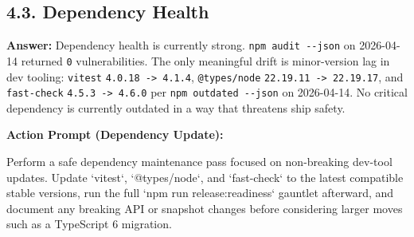 \subsection{4.3. Dependency Health}\label{record-416-dependency-health}

\textbf{Answer:} Dependency health is currently strong. \texttt{n\allowbreak{}p\allowbreak{}m\allowbreak{} \allowbreak{}a\allowbreak{}u\allowbreak{}d\allowbreak{}i\allowbreak{}t\allowbreak{} \allowbreak{}-\allowbreak{}-\allowbreak{}j\allowbreak{}s\allowbreak{}o\allowbreak{}n} on 2026-04-14 returned \texttt{0} vulnerabilities. The only meaningful drift is minor-version lag in dev tooling: \texttt{v\allowbreak{}i\allowbreak{}t\allowbreak{}e\allowbreak{}s\allowbreak{}t} \texttt{4\allowbreak{}.\allowbreak{}0\allowbreak{}.\allowbreak{}1\allowbreak{}8\allowbreak{} \allowbreak{}-\allowbreak{}>\allowbreak{} \allowbreak{}4\allowbreak{}.\allowbreak{}1\allowbreak{}.\allowbreak{}4}, \texttt{@\allowbreak{}t\allowbreak{}y\allowbreak{}p\allowbreak{}e\allowbreak{}s\allowbreak{}/\allowbreak{}n\allowbreak{}o\allowbreak{}d\allowbreak{}e} \texttt{2\allowbreak{}2\allowbreak{}.\allowbreak{}1\allowbreak{}9\allowbreak{}.\allowbreak{}1\allowbreak{}1\allowbreak{} \allowbreak{}-\allowbreak{}>\allowbreak{} \allowbreak{}2\allowbreak{}2\allowbreak{}.\allowbreak{}1\allowbreak{}9\allowbreak{}.\allowbreak{}1\allowbreak{}7}, and \texttt{f\allowbreak{}a\allowbreak{}s\allowbreak{}t\allowbreak{}-\allowbreak{}c\allowbreak{}h\allowbreak{}e\allowbreak{}c\allowbreak{}k} \texttt{4\allowbreak{}.\allowbreak{}5\allowbreak{}.\allowbreak{}3\allowbreak{} \allowbreak{}-\allowbreak{}>\allowbreak{} \allowbreak{}4\allowbreak{}.\allowbreak{}6\allowbreak{}.\allowbreak{}0} per \texttt{n\allowbreak{}p\allowbreak{}m\allowbreak{} \allowbreak{}o\allowbreak{}u\allowbreak{}t\allowbreak{}d\allowbreak{}a\allowbreak{}t\allowbreak{}e\allowbreak{}d\allowbreak{} \allowbreak{}-\allowbreak{}-\allowbreak{}j\allowbreak{}s\allowbreak{}o\allowbreak{}n} on 2026-04-14. No critical dependency is currently outdated in a way that threatens ship safety.

\textbf{Action Prompt (Dependency Update):}

\begin{CodeBlock}
Perform a safe dependency maintenance pass focused on non-breaking dev-tool updates. Update `vitest`, `@types/node`, and `fast-check` to the latest compatible stable versions, run the full `npm run release:readiness` gauntlet afterward, and document any breaking API or snapshot changes before considering larger moves such as a TypeScript 6 migration.
\end{CodeBlock}

